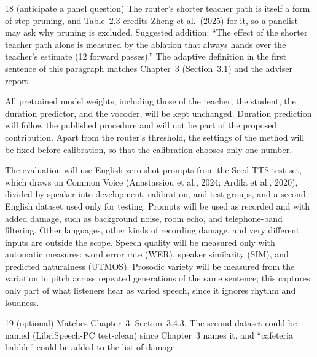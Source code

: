 \documentclass[11pt,a4paper]{article}
\newcounter{cmt}
\begin{document}
\begin{cmt}{18 (anticipate a panel question)}
The router's shorter teacher path is itself a form of step pruning, and Table~2.3 credits Zheng et al.\ (2025) for it, so a panelist may ask why pruning is excluded. Suggested addition: ``The effect of the shorter teacher path alone is measured by the ablation that always hands over the teacher's estimate (12 forward passes).'' The adaptive definition in the first sentence of this paragraph matches Chapter~3 (Section~3.1) and the adviser report.
\end{cmt}

All pretrained model weights, including those of the teacher, the student, the duration predictor, and the vocoder, will be kept unchanged. Duration prediction will follow the published procedure and will not be part of the proposed contribution. Apart from the router's threshold, the settings of the method will be fixed before calibration, so that the calibration chooses only one number.

The evaluation will use English zero-shot prompts from the Seed-TTS test set, which draws on Common Voice (Anastassiou et al., 2024; Ardila et al., 2020), divided by speaker into development, calibration, and test groups, and a second English dataset used only for testing. Prompts will be used as recorded and with added damage, such as background noise, room echo, and telephone-band filtering. Other languages, other kinds of recording damage, and very different inputs are outside the scope. Speech quality will be measured only with automatic measures: word error rate (WER), speaker similarity (SIM), and predicted naturalness (UTMOS). Prosodic variety will be measured from the variation in pitch across repeated generations of the same sentence; this captures only part of what listeners hear as varied speech, since it ignores rhythm and loudness.

\begin{cmt}{19 (optional)}
Matches Chapter~3, Section~3.4.3. The second dataset could be named (LibriSpeech-PC test-clean) since Chapter~3 names it, and ``cafeteria babble'' could be added to the list of damage.
\end{cmt}
\end{document}
